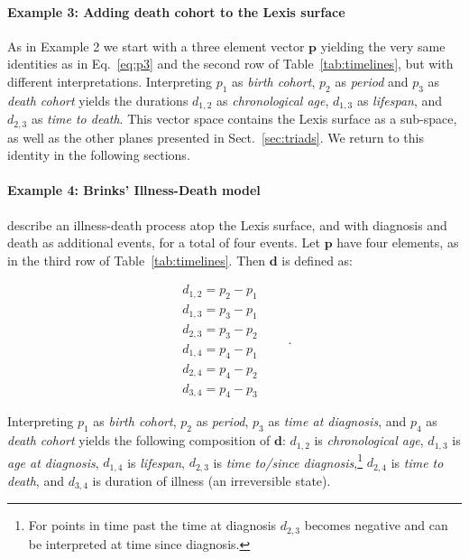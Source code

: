 \documentclass[12pt,oneside,a4paper]{article} %
\theoremstyle{definition}
\begin{document}
\paragraph{Example 3: Adding death cohort to the Lexis surface}

As in Example 2 we start with a three element vector
$\boldsymbol{p}$ yielding the very same identities as in Eq.~\eqref{eq:p3} and the second row of Table~\ref{tab:timelines}, but with different interpretations.
Interpreting $p_1$ as \textit{birth cohort}, $p_2$ as \textit{period} and $p_3$
as \textit{death cohort} yields the durations $d_{1,2}$ as \textit{chronological
age}, $d_{1,3}$ as \textit{lifespan}, and $d_{2,3}$ as \textit{time to death}.
This vector space contains the Lexis surface as a sub-space, as well as the other planes presented in Sect.~\ref{sec:triads}. We return to this identity
in the following sections.

\paragraph{Example 4: Brinks' Illness-Death model}

\citet{brinks2014lexis} describe an illness-death process atop the Lexis
surface, and with diagnosis and death as additional events, for a total of four
events. Let $\boldsymbol{p}$ have four elements, as in the third row of
Table~\ref{tab:timelines}. Then $\boldsymbol{d}$ is defined as:

\begin{equation}
\label{eq:p3}
\begin{matrix}
d_{1,2} = p_2 - p_1\\
d_{1,3} = p_3 - p_1\\
d_{2,3} = p_3 - p_2\\
d_{1,4} = p_4 - p_1\\
d_{2,4} = p_4 - p_2\\
d_{3,4} = p_4 - p_3
\end{matrix} \quad\quad.
\end{equation}

Interpreting $p_1$ as \textit{birth cohort}, $p_2$ as \textit{period}, $p_3$ as
\textit{time at diagnosis}, and $p_4$ as \textit{death cohort} yields the following composition
of $\boldsymbol{d}$: $d_{1,2}$ is \textit{chronological age}, $d_{1,3}$ is
\textit{age at diagnosis}, $d_{1,4}$ is \textit{lifespan}, $d_{2,3}$ is
\textit{time to/since diagnosis},\footnote{For points
in time past the time at diagnosis $d_{2,3}$ becomes negative and can be
interpreted at time since diagnosis.} $d_{2,4}$ is \textit{time to
death}, and $d_{3,4}$ is duration of illness (an irreversible state).
\end{document}
